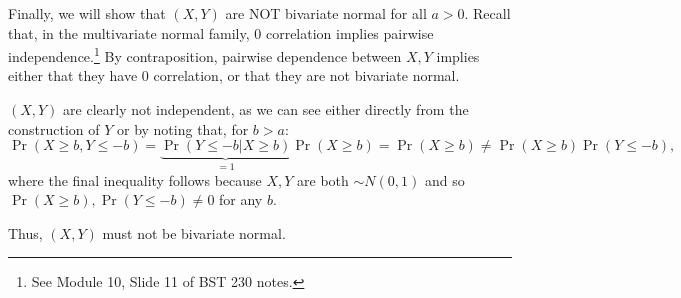 {    Finally, we will show that $(X,Y)$ are NOT bivariate normal for all $a > 0$.
    Recall that, in the multivariate normal family, 0 correlation implies 
    pairwise independence.\footnote{See Module 10, Slide 11 of BST 230 notes.}
    By contraposition, pairwise dependence between $X,Y$ implies either that 
    they have 0 correlation, or that they are not bivariate normal.

    $(X,Y)$ are clearly not independent, as we can see either directly 
    from the construction of $Y$ or by noting that, for $b > a$: 
    \[
        \Pr( X \geq b, Y \leq -b)
        =
        \underbrace{\Pr(Y \leq -b | X \geq b)}_{=1} \Pr (X \geq b)
        =
        \Pr(X \geq b)
        \neq 
        \Pr(X \geq b) \Pr(Y \leq -b),
    \] 
    where the final inequality follows because $X,Y$ are both $\sim N(0,1)$ 
    and so $\Pr(X \geq b),\Pr(Y \leq -b) \neq 0$ for any $b$.

    Thus, $(X,Y)$ must not be bivariate normal.
}